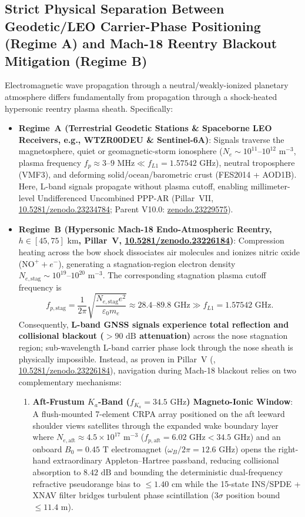 \documentclass[11pt,a4paper,reqno]{article}
\def\bm#1{#1}%
\def\texttt#1{#1}%
\newcommand{\zenodo}[1]{\href{https://doi.org/10.5281/zenodo.#1}{\texttt{10.5281/\allowbreak zenodo.#1}}}
\newcommand{\zenodoshort}[1]{\href{https://doi.org/10.5281/zenodo.#1}{\texttt{zenodo.#1}}}
\theoremstyle{plain}
\theoremstyle{definition}
\theoremstyle{remark}
\numberwithin{equation}{section}
\begin{document}
\subsection{Strict Physical Separation Between Geodetic/LEO Carrier-Phase Positioning (Regime A) and Mach-18 Reentry Blackout Mitigation (Regime B)}
Electromagnetic wave propagation through a neutral/weakly-ionized planetary atmosphere differs fundamentally from propagation through a shock-heated hypersonic reentry plasma sheath. Specifically:
\begin{itemize}[leftmargin=1.8em,itemsep=2pt]
  \item \textbf{Regime~A (Terrestrial Geodetic Stations \& Spaceborne LEO Receivers, e.g., \texttt{WTZR00DEU} \& \texttt{Sentinel-6A})}: Signals traverse the magnetosphere, quiet or geomagnetic-storm ionosphere ($N_e \sim 10^{11}\text{--}10^{12}\text{ m}^{-3}$, plasma frequency $f_p \approx 3\text{--}9\text{ MHz} \ll f_{L1} = 1.57542\text{ GHz}$), neutral troposphere (VMF3), and deforming solid/ocean/barometric crust (FES2014 + AOD1B). Here, L-band signals propagate without plasma cutoff, enabling millimeter-level Undifferenced Uncombined PPP-AR (Pillar~VII, \zenodo{23234784}; Parent V10.0: \zenodoshort{23229575}).
  \item \textbf{Regime~B (Hypersonic Mach-18 Endo-Atmospheric Reentry, $h \in [45, 75]\text{ km}$, Pillar~V, \zenodo{23226184})}: Compression heating across the bow shock dissociates air molecules and ionizes nitric oxide ($\text{NO}^+ + e^-$), generating a stagnation-region electron density $N_{e,\text{stag}} \sim 10^{19}\text{--}10^{20}\text{ m}^{-3}$. The corresponding stagnation plasma cutoff frequency is
  \begin{equation}
    f_{p,\text{stag}} = \frac{1}{2\pi}\sqrt{\frac{N_{e,\text{stag}} e^2}{\varepsilon_0 m_e}} \approx 28.4\text{--}89.8\text{ GHz} \gg f_{L1} = 1.57542\text{ GHz}.
    \label{eq:plasma_cutoff_blackout}
  \end{equation}
  Consequently, \textbf{L-band GNSS signals experience total reflection and collisional blackout ($> 90\text{ dB}$ attenuation)} across the nose stagnation region; sub-wavelength L-band carrier phase lock through the nose sheath is physically impossible. Instead, as proven in Pillar~V (\cite{UnmaniPillarV2026}, \zenodo{23226184}), navigation during Mach-18 blackout relies on two complementary mechanisms:
  \begin{enumerate}[label=(\alph*),leftmargin=1.6em,itemsep=1pt]
    \item \textbf{Aft-Frustum $K_a$-Band ($f_{K_a} = 34.5\text{ GHz}$) Magneto-Ionic Window}: A flush-mounted 7-element CRPA array positioned on the aft leeward shoulder views satellites through the expanded wake boundary layer where $N_{e,\text{aft}} \approx 4.5 \times 10^{17}\text{ m}^{-3}$ ($f_{p,\text{aft}} = 6.02\text{ GHz} < 34.5\text{ GHz}$) and an onboard $\bm{B}_0 = 0.45\text{ T}$ electromagnet ($\omega_B / 2\pi = 12.6\text{ GHz}$) opens the right-hand extraordinary Appleton--Hartree passband, reducing collisional absorption to $8.42\text{ dB}$ and bounding the deterministic dual-frequency refractive pseudorange bias to $\le 1.40\text{ cm}$ while the 15-state INS/SPDE + XNAV filter bridges turbulent phase scintillation ($3\sigma$ position bound $\le 11.4\text{ m}$).

\end{enumerate}
\end{itemize}
\end{document}
